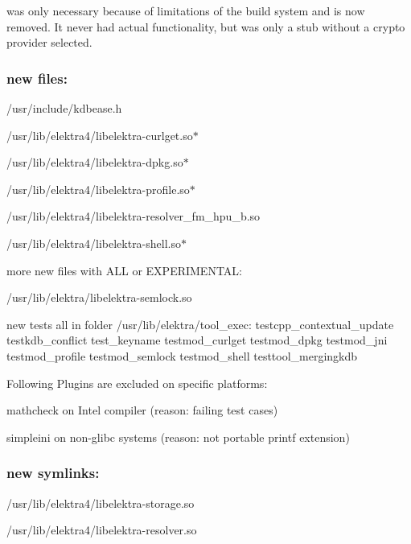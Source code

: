 was only necessary because of limitations of the build system and is now removed. It never had actual functionality, but was only a stub without a crypto provider selected.

\subsubsection*{new files\+:}


\begin{DoxyItemize}
\item /usr/include/kdbease.h
\item /usr/lib/elektra4/libelektra-\/curlget.so$\ast$
\item /usr/lib/elektra4/libelektra-\/dpkg.so$\ast$
\item /usr/lib/elektra4/libelektra-\/profile.so$\ast$
\item /usr/lib/elektra4/libelektra-\/resolver\+\_\+fm\+\_\+hpu\+\_\+b.so
\item /usr/lib/elektra4/libelektra-\/shell.so$\ast$
\end{DoxyItemize}

more new files with A\+L\+L or E\+X\+P\+E\+R\+I\+M\+E\+N\+T\+A\+L\+:


\begin{DoxyItemize}
\item /usr/lib/elektra/libelektra-\/semlock.so
\end{DoxyItemize}

new tests all in folder /usr/lib/elektra/tool\+\_\+exec\+: testcpp\+\_\+contextual\+\_\+update testkdb\+\_\+conflict test\+\_\+keyname testmod\+\_\+curlget testmod\+\_\+dpkg testmod\+\_\+jni testmod\+\_\+profile testmod\+\_\+semlock testmod\+\_\+shell testtool\+\_\+mergingkdb

Following Plugins are excluded on specific platforms\+:


\begin{DoxyItemize}
\item mathcheck on Intel compiler (reason\+: failing test cases)
\item simpleini on non-\/glibc systems (reason\+: not portable printf extension)
\end{DoxyItemize}

\subsubsection*{new symlinks\+:}


\begin{DoxyItemize}
\item /usr/lib/elektra4/libelektra-\/storage.so
\item /usr/lib/elektra4/libelektra-\/resolver.so
\end{DoxyItemize}

